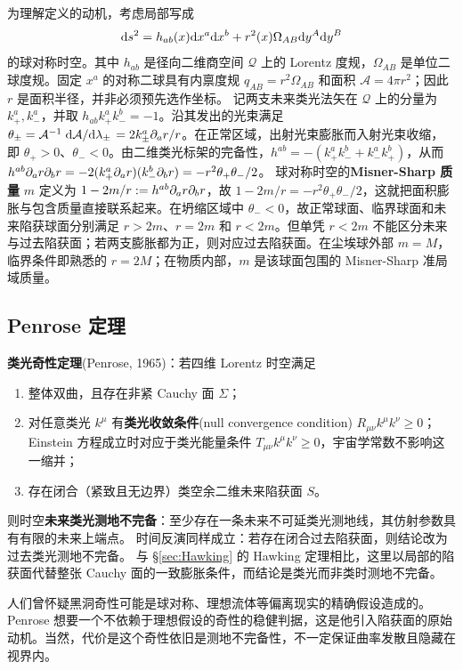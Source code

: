 为理解定义的动机，考虑局部写成
\[\dd s^2=h_{ab}(x)\dd x^a\dd x^b+r^2(x)\Omega_{AB}\dd y^A\dd y^B\]
的球对称时空。其中 $h_{ab}$ 是径向二维商空间 $\mathcal Q$ 上的 Lorentz 度规，$\Omega_{AB}$ 是单位二球度规。固定 $x^a$ 的对称二球具有内禀度规 $q_{AB}=r^2\Omega_{AB}$ 和面积 $\mathcal A=4\pi r^2$；因此 $r$ 是面积半径，并非必须预先选作坐标。
记两支未来类光法矢在 $\mathcal Q$ 上的分量为 $k_+^a,k_-^a$，并取 $h_{ab}k_+^ak_-^b=-1$。沿其发出的光束满足 $\theta_\pm=\mathcal A^{-1}\dv*{\mathcal A}{\lambda_\pm}=2k_\pm^a\partial_ar/r$。在正常区域，出射光束膨胀而入射光束收缩，即 $\theta_+>0$、$\theta_-<0$。由二维类光标架的完备性，$h^{ab}=-(k_+^ak_-^b+k_-^ak_+^b)$，从而 $h^{ab}\partial_ar\partial_br=-2(k_+^a\partial_ar)(k_-^b\partial_br)=-r^2\theta_+\theta_-/2$。
球对称时空的\textbf{Misner-Sharp 质量} $m$ 定义为 $1-2m/r:=h^{ab}\partial_ar\partial_br$，故 $1-2m/r=-r^2\theta_+\theta_-/2$，这就把面积膨胀与包含质量直接联系起来。在坍缩区域中 $\theta_-<0$，故正常球面、临界球面和未来陷获球面分别满足 $r>2m$、$r=2m$ 和 $r<2m$。但单凭 $r<2m$ 不能区分未来与过去陷获面；若两支膨胀都为正，则对应过去陷获面。在尘埃球外部 $m=M$，临界条件即熟悉的 $r=2M$；在物质内部，$m$ 是该球面包围的 Misner-Sharp 准局域质量。


\subsection{Penrose 定理}\label{sec:Penrose}

\noindent \textbf{类光奇性定理}(Penrose, 1965)：若四维 Lorentz 时空满足
\begin{enumerate}
    \item 整体双曲，且存在非紧 Cauchy 面 $\Sigma$；
    \item 对任意类光 $k^\mu$ 有\textbf{类光收敛条件}(null convergence condition) $R_{\mu\nu}k^\mu k^\nu\geqslant0$；Einstein 方程成立时对应于类光能量条件 $T_{\mu\nu}k^\mu k^\nu\geqslant0$，宇宙学常数不影响这一缩并；
    \item 存在闭合（紧致且无边界）类空余二维未来陷获面 $S$。
\end{enumerate}
则时空\textbf{未来类光测地不完备}：至少存在一条未来不可延类光测地线，其仿射参数具有有限的未来上端点。
时间反演同样成立：若存在闭合过去陷获面，则结论改为过去类光测地不完备。
与 \S\ref{sec:Hawking} 的 Hawking 定理相比，这里以局部的陷获面代替整张 Cauchy 面的一致膨胀条件，而结论是类光而非类时测地不完备。

人们曾怀疑黑洞奇性可能是球对称、理想流体等偏离现实的精确假设造成的。Penrose 想要一个不依赖于理想假设的奇性的稳健判据，这是他引入陷获面的原始动机。当然，代价是这个奇性依旧是测地不完备性，不一定保证曲率发散且隐藏在视界内。

